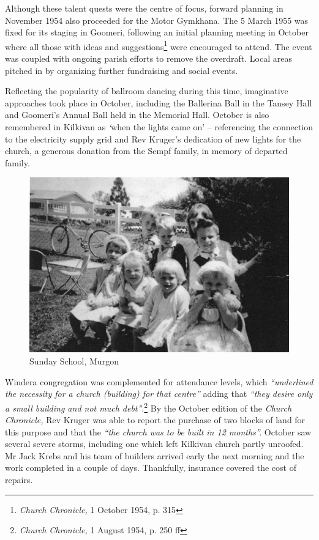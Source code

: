 Although these talent quests were the centre of focus, forward planning in November 1954 also proceeded for the Motor Gymkhana. The 5 March 1955 was fixed for its staging in Goomeri, following an initial planning meeting in October where all those with ideas and suggestions\footnote{\emph{Church Chronicle,} 1 October 1954, p. 315} were encouraged to attend. The event was coupled with ongoing parish efforts to remove the overdraft. Local areas pitched in by organizing further fundraising and social events.


Reflecting the popularity of ballroom dancing during this time, imaginative approaches took place in October, including the Ballerina Ball in the Tansey Hall and Goomeri's Annual Ball held in the Memorial Hall. October is also remembered in Kilkivan as \emph{`}when the lights came on' -- referencing the connection to the electricity supply grid and Rev Kruger's dedication of new lights for the church, a generous donation from the Sempf family, in memory of departed family.









\begin{figure}
\begin{center}
\includegraphics[width=1.\linewidth,center]{../images/sundaySchoolMurgon.jpg}
\caption{Sunday School, Murgon}
\end{center}
\end{figure}




Windera congregation was complemented for attendance levels, which \emph{``underlined the necessity for a church (building) for that centre''} adding that \emph{``they desire only a small building and not much debt''}.\footnote{\emph{Church Chronicle,} 1 August 1954, p. 250 ff} By the October edition of the \emph{Church Chronicle,} Rev Kruger was able to report the purchase of two blocks of land for this purpose and that the \emph{``the church was to be built in 12 months''.} October saw several severe storms, including one which left Kilkivan church partly unroofed. Mr Jack Krebs and his team of builders arrived early the next morning and the work completed in a couple of days. Thankfully, insurance covered the cost of repairs.



